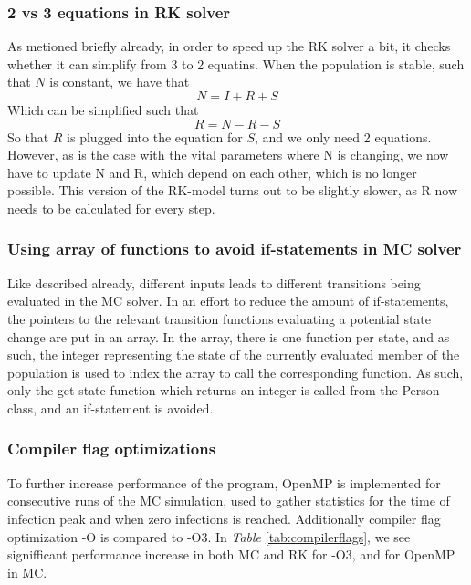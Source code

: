 \subsubsection{2 vs 3 equations in RK solver}
As metioned briefly already, in order to speed up the RK solver a bit, it checks whether it can simplify from 3 to 2 equatins.
When the population is stable, such that $N$ is constant, we have that
\begin{equation}
    N=I+R+S
\end{equation}
Which can be simplified such that
$$
R=N-R-S
$$
So that $R$ is plugged into the equation for $S$, and we only need 2 equations. 
However, as is the case with the vital parameters where N is changing, we now have to update N and R, which depend on each other, 
which is no longer possible. This version of the RK-model turns out to be slightly slower, as R now needs to be calculated for every step.


\subsubsection{Using array of functions to avoid if-statements in MC solver}
Like described already, different inputs leads to different transitions being evaluated in the MC solver. 
In an effort to reduce the amount of if-statements, the pointers to the relevant transition functions evaluating a potential state change are put in an array.
In the array, there is one function per state, and as such, the integer representing the state of the currently evaluated member of the population is used to index the array to call the corresponding function. 
As such, only the get state function which returns an integer is called from the Person class, and an if-statement is avoided.

\subsubsection{Compiler flag optimizations}
To further increase performance of the program, OpenMP is implemented for consecutive runs of the MC simulation, used to gather statistics 
for the time of infection peak and when zero infections is reached. Additionally compiler flag optimization -O is compared to -O3.
In \textit{Table} \ref{tab:compilerflags}, we see signifficant performance increase in both MC and RK for -O3, and for OpenMP in MC.

